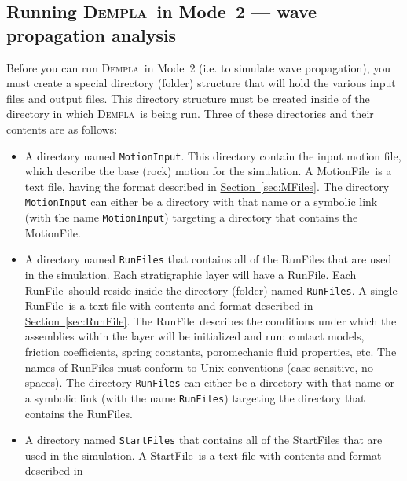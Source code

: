 \documentclass[letterpaper,11pt]{article}
\newcommand{\Dempla}{\textsc{Dempla}}
\newcommand{\RunFile}{\textsf{RunFile}}
\newcommand{\StartFile}{\textsf{StartFile}}
\newcommand{\MotionFile}{\textsf{MotionFile}}
\begin{document}
\subsection{Running \Dempla\ in Mode~2 --- wave propagation analysis}
\label{sec:running2}
    Before you can run \Dempla\ in Mode~2
    (i.e. to simulate wave propagation),
    you must create a special directory (folder) structure that will
    hold the various input files and output files.
    This directory structure must be created inside of
    the directory in which \Dempla\ is being run.
    Three of these directories and their contents are
    as follows:
%
    \begin{itemize}
      \item
        A directory named \texttt{MotionInput}.
        This directory contain the input motion
        file, which describe the base (rock) motion
        for the simulation.
        A \MotionFile\ is a text file, having the
        format described in
        \hyperref[sec:MFiles]{Section~\ref*{sec:MFiles}}.
        The directory \texttt{MotionInput} can either
        be a directory with that name or a symbolic link
        (with the name \texttt{MotionInput}) targeting
        a directory that contains the \MotionFile.
      \item\label{item:RunFileDir}
        A directory named \texttt{RunFiles} that
        contains all of the \RunFile s that are used in
        the simulation.
        Each stratigraphic layer will have a \RunFile.
        Each \RunFile\ should reside inside the directory
        (folder) named \texttt{RunFiles}.
        A single \RunFile\ is a text file with
        contents and format described in
        \hyperref[sec:RunFile]{Section~\ref*{sec:RunFile}}.
        The \RunFile\ describes
        the conditions under which the
        assemblies within the layer will be initialized
        and run:
        contact models,
        friction coefficients, spring constants,
        poromechanic fluid properties, etc.
        The names of \RunFile s must conform
        to Unix conventions
        (case-sensitive, no spaces).
        The directory \texttt{RunFiles} can either
        be a directory with that name or a symbolic link
        (with the name \texttt{RunFiles}) targeting
        the directory that contains the \RunFile s.
      \item
        A directory named \texttt{StartFiles} that
        contains all of the \StartFile s that are used
        in the simulation.
        A \StartFile\ is a text file with
        contents and format described in

\end{itemize}
\end{document}
